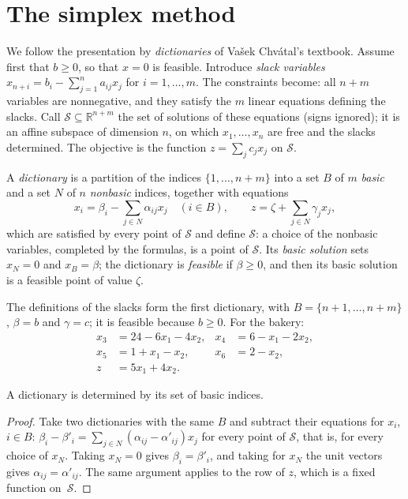\section{The simplex method}\label{sec:simplex}

We follow the presentation by \emph{dictionaries} of Va\v sek Chv\'atal's textbook. Assume first that $b\ge0$, so that $x=0$ is feasible. Introduce \emph{slack variables}
$x_{n+i}=b_i-\sum_{j=1}^na_{ij}x_j$ for $i=1,\dots,m$. The constraints become: all $n+m$ variables are nonnegative, and they satisfy the $m$ linear equations defining the slacks. Call
$\mathcal S\subseteq\mathbb R^{n+m}$ the set of solutions of these equations (signs ignored); it is an affine subspace of dimension $n$, on which $x_1,\dots,x_n$ are free and the slacks determined.
The objective is the function $z=\sum_jc_jx_j$ on $\mathcal S$.

\begin{definition}
A \emph{dictionary} is a partition of the indices $\{1,\dots,n+m\}$ into a set $B$ of $m$ \emph{basic} and a set $N$ of $n$ \emph{nonbasic} indices, together with equations
\[
x_i=\beta_i-\sum_{j\in N}\alpha_{ij}x_j\quad(i\in B),\qquad z=\zeta+\sum_{j\in N}\gamma_jx_j,
\]
which are satisfied by every point of $\mathcal S$ and define $\mathcal S$: a choice of the nonbasic variables, completed by the formulas, is a point of $\mathcal S$. Its \emph{basic solution} sets
$x_N=0$ and $x_B=\beta$; the dictionary is \emph{feasible} if $\beta\ge0$, and then its basic solution is a feasible point of value $\zeta$.
\end{definition}

The definitions of the slacks form the first dictionary, with $B=\{n+1,\dots,n+m\}$, $\beta=b$ and $\gamma=c$; it is feasible because $b\ge0$. For the bakery:
\[
\begin{aligned}
x_3&=24-6x_1-4x_2, & x_4&=6-x_1-2x_2,\\
x_5&=1+x_1-x_2, & x_6&=2-x_2,\\
z&=5x_1+4x_2.
\end{aligned}
\]

\begin{lemma}\label{lem:dictunique}
A dictionary is determined by its set of basic indices.
\end{lemma}
\begin{proof}
Take two dictionaries with the same $B$ and subtract their equations for $x_i$, $i\in B$: $\beta_i-\beta'_i=\sum_{j\in N}(\alpha_{ij}-\alpha'_{ij})x_j$ for every point of $\mathcal S$, that is, for every choice of $x_N$.
Taking $x_N=0$ gives $\beta_i=\beta'_i$, and taking for $x_N$ the unit vectors gives $\alpha_{ij}=\alpha'_{ij}$. The same argument applies to the row of $z$, which is a fixed function on~$\mathcal S$.
\end{proof}

